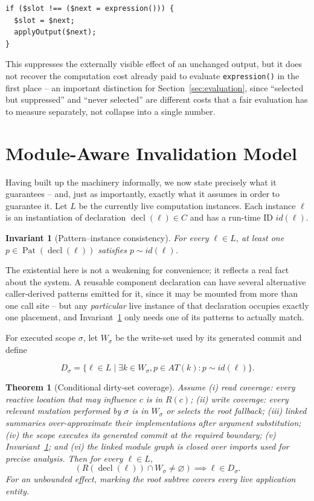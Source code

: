 \documentclass[conference]{IEEEtran}
\newtheorem{theorem}{Theorem}
\newtheorem{invariant}{Invariant}
\begin{document}
\begin{lstlisting}[caption={Guarded output slot}]
if ($slot !== ($next = expression())) {
  $slot = $next;
  applyOutput($next);
}
\end{lstlisting}

This suppresses the externally visible effect of an unchanged output, but it
does not recover the computation cost already paid to evaluate
\texttt{expression()} in the first place -- an important distinction for
Section~\ref{sec:evaluation}, since ``selected but suppressed'' and ``never
selected'' are different costs that a fair evaluation has to measure
separately, not collapse into a single number.

\section{Module-Aware Invalidation Model}
\label{sec:formal}

Having built up the machinery informally, we now state precisely what it
guarantees -- and, just as importantly, exactly what it assumes in order to
guarantee it. Let $L$ be the currently live computation instances. Each
instance $\ell$ is an instantiation of declaration
$\operatorname{decl}(\ell)\in C$ and has a run-time ID $id(\ell)$.

\begin{invariant}[Pattern--instance consistency]
\label{inv:pattern}
For every $\ell\in L$, at least one
$p\in\operatorname{Pat}(\operatorname{decl}(\ell))$ satisfies
$p\sim id(\ell)$.
\end{invariant}

The existential here is not a weakening for convenience; it reflects a real
fact about the system. A reusable component declaration can have several
alternative caller-derived patterns emitted for it, since it may be mounted
from more than one call site -- but any \emph{particular} live instance of
that declaration occupies exactly one placement, and Invariant~\ref{inv:pattern}
only needs one of its patterns to actually match.

For executed scope $\sigma$, let $W_\sigma$ be the write-set used by its
generated commit and define

\[
D_\sigma=\{\ell\in L\mid
  \exists k\in W_\sigma, p\in AT(k):p\sim id(\ell)\}.
\]

\begin{theorem}[Conditional dirty-set coverage]
\label{thm:coverage}
Assume (i) read coverage: every reactive location that may influence $c$ is in
$R(c)$; (ii) write coverage: every relevant mutation performed by $\sigma$ is
in $W_\sigma$ or selects the root fallback; (iii) linked summaries
over-approximate their implementations after argument substitution; (iv) the
scope executes its generated commit at the required boundary; (v)
Invariant~\ref{inv:pattern}; and (vi) the linked module graph is closed over
imports used for precise analysis. Then for every $\ell\in L$,
\[
(R(\operatorname{decl}(\ell))\cap W_\sigma\neq\varnothing)
\implies \ell\in D_\sigma.
\]
For an unbounded effect, marking the root subtree covers every live application
entity.
\end{theorem}
\end{document}
